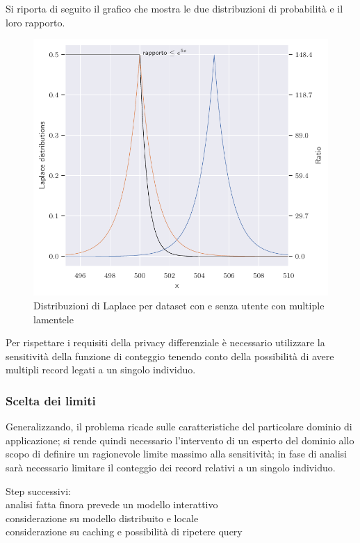 Si riporta di seguito il grafico che mostra le due distribuzioni di probabilità e il loro rapporto.
\begin{figure}[H]
    \centering
    \includegraphics[scale=0.7]{plots/double_laplace_pdf.pdf}
    \caption{Distribuzioni di Laplace per dataset con e senza utente con multiple lamentele}
\end{figure}

Per rispettare i requisiti della privacy differenziale è necessario utilizzare la sensitività della funzione di conteggio tenendo conto della possibilità di avere multipli record legati a un singolo individuo.

\subsubsection{Scelta dei limiti}
Generalizzando, il problema ricade sulle caratteristiche del particolare dominio di applicazione; si rende quindi necessario l'intervento di un esperto del dominio allo scopo di definire un ragionevole limite massimo alla sensitività; in fase di analisi sarà necessario limitare il conteggio dei record relativi a un singolo individuo.









\newpage
Step successivi:\\
analisi fatta finora prevede un modello interattivo\\
considerazione su modello distribuito e locale\\
considerazione su caching e possibilità di ripetere query\\